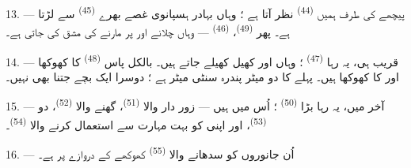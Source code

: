 13. --- پیچھے کی طرف ہمیں  \textsuperscript{(44)}
نظر آتا ہے ؛ وہاں بہادر ہسپانوی  غصے بھرے
 \textsuperscript{(45)} سے لڑتا ہے۔ پھر  \textsuperscript{(49)}، 
\textsuperscript{(46)} — وہاں  چلانے اور
 پر مارنے کی مشق کی جاتی ہے۔

14. --- قریب ہی، یہ رہا 
\textsuperscript{(47)} ؛ وہاں  اور  کھیل
کھیلے جاتے ہیں۔ بالکل پاس  \textsuperscript{(48)}
کا کھوکھا اور  کا کھوکھا ہیں۔ پہلے کا
 دو میٹر پندرہ سنٹی میٹر ہے ؛ دوسرا ایک بچے جتنا بھی
نہیں۔

15. --- آخر میں، یہ رہا بڑا  \textsuperscript{(50)} ؛
اُس میں  ہیں — زور دار  والا
 \textsuperscript{(51)}، گھنے  والا
 \textsuperscript{(52)}، دو 
\textsuperscript{(53)}، اور اپنی  کو بہت مہارت سے
استعمال کرنے والا  \textsuperscript{(54)}۔

16. --- اُن جانوروں کو سدھانے والا 
\textsuperscript{(55)} کھوکھے کے دروازے پر ہے۔

\VUsaut{6.0mm}
\VUfilet{22mm}
